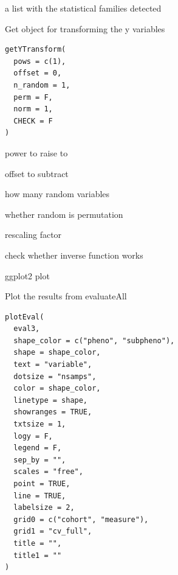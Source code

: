\documentclass[letterpaper]{book}
\begin{document}
%
\begin{Value}
a list with the statistical families detected
\end{Value}
%
\begin{Description}
Get object for transforming the y variables
\end{Description}
%
\begin{Usage}
\begin{verbatim}
getYTransform(
  pows = c(1),
  offset = 0,
  n_random = 1,
  perm = F,
  norm = 1,
  CHECK = F
)
\end{verbatim}
\end{Usage}
%
\begin{Arguments}
\begin{ldescription}
\item[\code{pows}] power to raise to

\item[\code{offset}] offset to subtract

\item[\code{n\_random}] how many random variables

\item[\code{perm}] whether random is permutation

\item[\code{norm}] rescaling factor

\item[\code{CHECK}] check whether inverse function works
\end{ldescription}
\end{Arguments}
%
\begin{Value}
ggplot2 plot
\end{Value}
%
\begin{Description}
Plot the results from evaluateAll
\end{Description}
%
\begin{Usage}
\begin{verbatim}
plotEval(
  eval3,
  shape_color = c("pheno", "subpheno"),
  shape = shape_color,
  text = "variable",
  dotsize = "nsamps",
  color = shape_color,
  linetype = shape,
  showranges = TRUE,
  txtsize = 1,
  logy = F,
  legend = F,
  sep_by = "",
  scales = "free",
  point = TRUE,
  line = TRUE,
  labelsize = 2,
  grid0 = c("cohort", "measure"),
  grid1 = "cv_full",
  title = "",
  title1 = ""
)
\end{verbatim}
\end{Usage}
\end{document}
